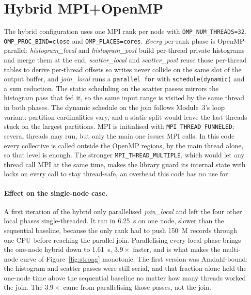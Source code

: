 \documentclass[10pt,twocolumn,a4paper]{article}
\begin{document}
\section{Hybrid MPI+OpenMP}\label{sec:hybrid}
The hybrid configuration uses one MPI rank per node with
\texttt{OMP\_NUM\_THREADS=32}, \texttt{OMP\_PROC\_BIND=close} and
\texttt{OMP\_PLACES=cores}. \emph{Every} per-rank phase is
OpenMP-parallel: \emph{histogram\_local} and \emph{histogram\_post}
build per-thread private histograms and merge them at the end,
\emph{scatter\_local} and \emph{scatter\_post} reuse those
per-thread tables to derive per-thread offsets so writes never
collide on the same slot of the output buffer, and
\emph{join\_local} runs a \texttt{parallel for} with
\texttt{schedule(dynamic)} and a sum reduction. The static
scheduling on the scatter passes mirrors the histogram pass that
fed it, so the same input range is visited by the same thread in
both phases. The dynamic schedule on the join follows Module~3's
loop variant: partition cardinalities vary, and a static split
would leave the last threads stuck on the largest partitions. MPI
is initialised with \texttt{MPI\_THREAD\_FUNNELED}: several threads may
run, but only the main one issues MPI calls. In this code every
collective is called outside the OpenMP regions, by the main thread
alone, so that level is enough. The stronger
\texttt{MPI\_THREAD\_MULTIPLE}, which would let any thread call MPI at
the same time, makes the library guard its internal state with locks on
every call to stay thread-safe, an overhead this code has no use for.

\paragraph{Effect on the single-node case.}
A first iteration of the hybrid only parallelised
\emph{join\_local} and left the four other local phases
single-threaded. It ran in \SI{6.25}{s} on one node, slower than
the sequential baseline, because the only rank had to push
\SI{150}{M} records through one CPU before reaching the parallel
join. Parallelising every local phase brings the one-node hybrid
down to \SI{1.61}{s}, $3.9\times$ faster, and is what makes the
multi-node curve of Figure~\ref{fig:strong} monotonic. The first
version was Amdahl-bound: the histogram and scatter passes were still
serial, and that fraction alone held the one-node time above the
sequential baseline no matter how many threads worked the join. The
$3.9\times$ came from parallelising those passes, not the join.
\end{document}
